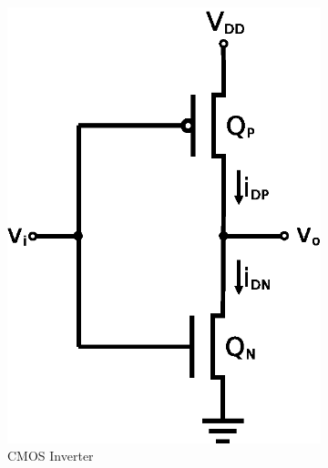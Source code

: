  \begin{figure}[hbtp]
   \centering
   \begin{subfigure}[b]{0.5\textwidth}
     \includegraphics[width=\textwidth]{invert}
     \caption{\label{fig:invert} CMOS Inverter}
   \end{subfigure}%
   ~
   \begin{subfigure}[b]{0.5\textwidth}

\end{subfigure}
\end{figure}
